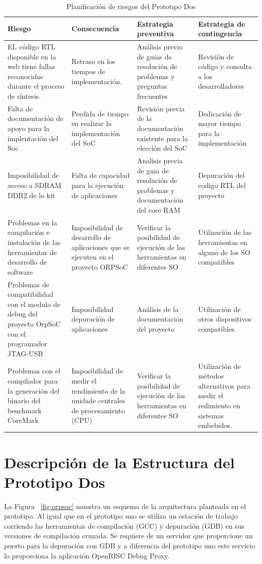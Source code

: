  		\begin{table}[h!]
		\centering
		\begin{tabular}{ p{4cm} p{4cm} p{4cm} p{3cm} }
		\hline 
		\rowcolor[gray]{0.8} Riesgo & Consecuencia & Estrategia preventiva & Estrategia de contingencia\\
		\hline
		EL código RTL disponible en la web tiene fallas reconocidas durante el proceso de síntesis.&Retraso en los tiempos de implementación.& Análisis previo de guías de resolución de problemas y preguntas frecuentes & Revisión de código y consulta a los desarrolladores \\		 
		\hline
		Falta de documentación de apoyo para la implentación
del Soc& Perdida de tiempo en realizar la implementación
del SoC & Revisión previa de la documentación existente para la elección del
SoC & Dedicación de mayor tiempo para la implementación\\ 
		\hline
		 Imposibilidad de acceso a SDRAM DDR2 de lo kit & Falta de capacidad para la ejecución de aplicaciones & Analisis previa de guia de resolución de problemas y documentación del core RAM & Depuración del codigo RTL del proyecto\\
		\hline
		Problemas en la compilación e instalación de las herramientas de desarrollo de software & Imposibilidad de desarrollo de aplicaciones que se ejecuten en el proyecto ORPSoC & Verificar la posibilidad de ejecución de las herramientas en diferentes SO & Utilización de las herramientas en alguno de los SO compatibles\\			
		\hline
		Problemas de compatibilidad con el modulo de debug del proyecto OrpSoC con el programador JTAG-USB & Imposibilidad depuración de aplicaciones &Análisis de la documentación del proyecto& Utilización de otros  dispositivos compatibles.\\		
		\hline
		Problemas con el compilador para la generación del binario del benchmark CoreMark & Imposibilidad de medir el rendimiento de la unidade centrales de procesamiento (CPU) & Verificar la posibilidad de ejecución de las herramientas en diferentes SO & Utilización de métodos alternativos para medir el redimiento en sistemas embebidos.\\
		\hline
		\end{tabular}
		\caption{Planificación de riesgos del Prototipo Dos}
		\end{table}


\newpage
		\section{Descripción de la Estructura del Prototipo Dos}
		La Figura ~\ref{fig:orpsoc} muestra un esquema de la arquitectura planteada en el prototipo. Al igual que en el prototipo uno se utiliza un estación
		de trabajo corriendo las herramientas de compilación (GCC) y depuración (GDB) en sus versiones de compilación cruzada. Se requiere de un servidor
		que proporcione un puerto para la depuración con GDB y a diferencia del prototipo uno este servicio lo proporciona la aplicación OpenRISC Debug
		Proxy.
		
